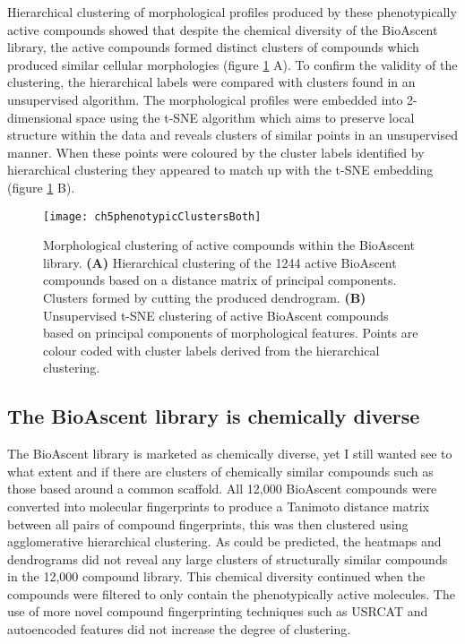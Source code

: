 \documentclass[a4paper,11pt,twoside,openright]{scrbook}
\begin{document}
Hierarchical clustering of morphological profiles produced by these phenotypically active compounds showed that despite 
the chemical diversity of the BioAscent library, the active compounds formed distinct clusters of compounds which 
produced similar cellular morphologies (figure \ref{figure:morph_cluster} A).
To confirm the validity of the clustering, the hierarchical labels were compared with clusters found in an unsupervised 
algorithm.
The morphological profiles were embedded into 2-dimensional space using the t-SNE algorithm \cite{Maaten2008} which 
aims to preserve local structure within the data and reveals clusters of similar points in an unsupervised manner.
When these points were coloured by the cluster labels identified by hierarchical clustering they appeared to match up 
with the t-SNE embedding (figure \ref{figure:morph_cluster} B).

\begin{figure}
    \captionsetup{width=0.8\textwidth}
    \caption[Morphological clustering of the BioAscent library]{
Morphological clustering of active compounds within the BioAscent library.
    \textbf{(A)} Hierarchical clustering of the 1244 active BioAscent compounds based on a distance matrix of principal 
components.
    Clusters formed by cutting the produced dendrogram.
    \textbf{(B)} Unsupervised t-SNE clustering of active BioAscent compounds based on principal components of 
morphological features.
    Points are colour coded with cluster labels derived from the hierarchical clustering.
}
    \texttt{[image: ch5phenotypicClustersBoth]}
    \label{figure:morph_cluster}
\end{figure}


\subsection{The BioAscent library is chemically diverse}
The BioAscent library is marketed as chemically diverse, yet I still wanted see to what extent and if there are 
clusters of chemically similar compounds such as those based around a common scaffold.
All 12,000 BioAscent compounds were converted into molecular fingerprints to produce a Tanimoto distance matrix between 
all pairs of compound fingerprints, this was then clustered using agglomerative hierarchical clustering.
As could be predicted, the heatmaps and dendrograms did not reveal any large clusters of structurally similar compounds 
in the 12,000 compound library.
This chemical diversity continued when the compounds were filtered to only contain the phenotypically active molecules.
The use of more novel compound fingerprinting techniques such as USRCAT \cite{Schreyer2012} and autoencoded features 
\cite{Gomez-Bombarelli2016} did not increase the degree of clustering.
\end{document}
